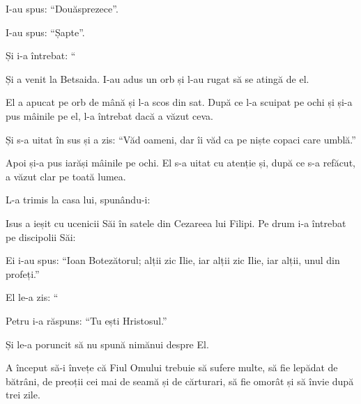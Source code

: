 {

\par }{\PP I-au spus: “Douăsprezece”.


\par }{\PP {}

\par }{\PP I-au spus: “Șapte”.


\par }{\PP {}Și i-a întrebat: “{}


\par }{\PP {}Și a venit la Betsaida. I-au adus un orb și l-au rugat să se atingă de el.

El a apucat pe orb de mână și l-a scos din sat. După ce l-a scuipat pe ochi și și-a pus mâinile pe el, l-a întrebat dacă a văzut ceva.


\par }{\PP {}Și s-a uitat în sus și a zis: “Văd oameni, dar îi văd ca pe niște copaci care umblă.”


\par }{\PP {}Apoi și-a pus iarăși mâinile pe ochi. El s-a uitat cu atenție și, după ce s-a refăcut, a văzut clar pe toată lumea.

L-a trimis la casa lui, spunându-i:
{}


\par }{\PP {}Isus a ieșit cu ucenicii Săi în satele din Cezareea lui Filipi. Pe drum i-a întrebat pe discipolii Săi:
{}


\par }{\PP {}Ei i-au spus: “Ioan Botezătorul; alții zic Ilie, iar alții zic Ilie, iar alții, unul din profeți.”


\par }{\PP {}El le-a zis: “{}

\par }{\PP Petru i-a răspuns: “Tu ești Hristosul.”


\par }{\PP {}Și le-a poruncit să nu spună nimănui despre El.

A început să-i învețe că Fiul Omului trebuie să sufere multe, să fie lepădat de bătrâni, de preoții cei mai de seamă și de cărturari, să fie omorât și să învie după trei zile.

}
